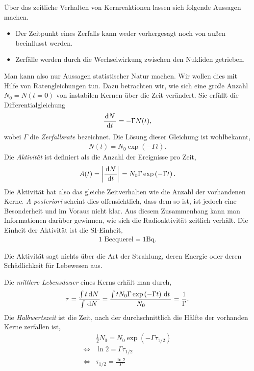 Über das zeitliche Verhalten von Kernreaktionen lassen sich folgende Aussagen
machen.
\begin{itemize}
  \item Der Zeitpunkt eines Zerfalls kann weder vorhergesagt noch von
  außen beeinflusst werden.
  \item Zerfälle werden durch die Wechselwirkung zwischen den Nukliden
  getrieben.
\end{itemize}
Man kann also nur Aussagen statistischer Natur machen. Wir wollen dies mit
Hilfe von Ratengleichungen tun. Dazu betrachten wir, wie sich eine große
Anzahl $N_0=N(t=0)$ von instabilen Kernen über die Zeit verändert. Sie erfüllt
die Differentialgleichung
\begin{align*}
\frac{\,\mathrm{d} N\,}{\,\mathrm{d} t\,} = -\Gamma N(t),
\end{align*}
wobei $\Gamma$ die \emph{Zerfallsrate} bezeichnet. Die Lösung dieser Gleichung
ist wohlbekannt,
\begin{align*}
N(t) = N_0 \exp\left(-\Gamma t\right).
\end{align*}
Die \emph{Aktivität} ist definiert als die Anzahl der Ereignisse pro Zeit,
\begin{align*}
A(t) = \left|\frac{\,\mathrm{d} N\,}{\,\mathrm{d} t\,}\right| = N_0 \Gamma \exp\left(-\Gamma t\right).
\end{align*}
Die Aktivität hat also das gleiche Zeitverhalten wie die Anzahl der vorhandenen
Kerne. \textit{A posteriori} scheint dies offensichtlich, dass dem so ist, ist
jedoch eine Besonderheit und im Voraus nicht klar. Aus diesem Zusammenhang kann
man Informationen darüber gewinnen, wie sich die Radioaktivität zeitlich
verhält. Die Einheit der Aktivität ist die SI-Einheit,
\begin{align*}
1 \text{ Becquerel} = 1\mathrm{Bq}.
\end{align*}
\begin{bemn}
Die Aktivität sagt nichts über die Art der Strahlung, deren Energie oder deren
Schädlichkeit für Lebewesen aus.\maphere 
\end{bemn}
Die \emph{mittlere Lebensdauer} eines Kerns erhält man durch,
\begin{align*}
\tau = \frac{\int t\,\mathrm{d} N\,}{\int \,\mathrm{d} N\,} = \frac{\int t N_0 \Gamma \exp\left(-\Gamma
t\right)\,\mathrm{d} t\,}{N_0} = \frac{1}{\Gamma}.
\end{align*}
Die \emph{Halbwertszeit} ist die Zeit, nach der durchschnittlich die Hälfte der
vorhanden Kerne zerfallen ist,
\begin{align*}
&\frac{1}{2} N_0 = N_0 \exp\left(-\Gamma \tau_{1/2}\right)\\
\Leftrightarrow & \ln 2 = \Gamma \tau_{1/2}\\ 
\Leftrightarrow & \tau_{1/2} = \frac{\ln2}{\Gamma}
\end{align*}

